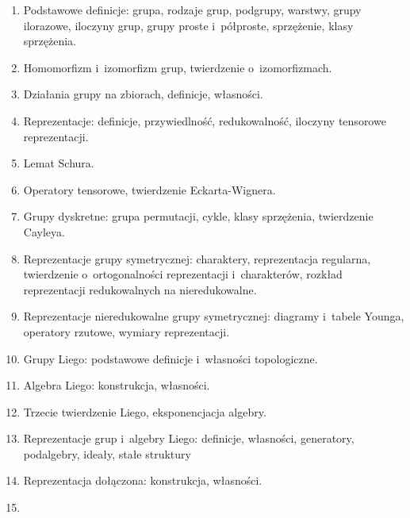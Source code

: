 \documentclass[a4paper,11pt]{article}
\begin{document}
\begin{enumerate}

\item Podstawowe definicje: grupa, rodzaje grup, podgrupy, warstwy, grupy
  ilorazowe, iloczyny grup, grupy proste i~półproste, sprzężenie, klasy
  sprzężenia.

\item Homomorfizm i~izomorfizm grup, twierdzenie o~izomorfizmach.

\item Działania grupy na zbiorach, definicje, własności.

\item Reprezentacje: definicje, przywiedlność, redukowalność, iloczyny
  tensorowe reprezentacji.

\item Lemat Schura.

\item Operatory tensorowe, twierdzenie Eckarta-Wignera.

\item Grupy dyskretne: grupa permutacji, cykle, klasy sprzężenia,
  twierdzenie Cayleya.

\item Reprezentacje grupy symetrycznej: charaktery, reprezentacja regularna, twierdzenie o~ortogonalności reprezentacji i~charakterów, rozkład reprezentacji redukowalnych na nieredukowalne.

\item Reprezentacje nieredukowalne grupy symetrycznej: diagramy i~tabele Younga, operatory rzutowe, wymiary reprezentacji.

\item Grupy Liego: podstawowe definicje i~własności topologiczne.

\item Algebra Liego: konstrukcja, własności.

\item Trzecie twierdzenie Liego, eksponencjacja algebry.

\item Reprezentacje grup i~algebry Liego: definicje, własności, generatory,
  podalgebry, ideały, stałe struktury

\item Reprezentacja dołączona: konstrukcja, własności.

\item

\end{enumerate}
\end{document}
